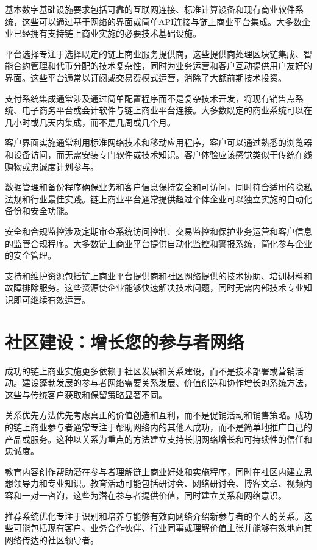 \documentclass[
  Letterpaper,
]{scrbook}
\begin{document}
基本数字基础设施要求包括可靠的互联网连接、标准计算设备和现有商业软件系统，这些可以通过基于网络的界面或简单API连接与链上商业平台集成。大多数企业已经拥有支持链上商业实施的必要技术基础设施。

平台选择专注于选择既定的链上商业服务提供商，这些提供商处理区块链集成、智能合约管理和代币分配的技术复杂性，同时为业务运营和客户互动提供用户友好的界面。这些平台通常以订阅或交易费模式运营，消除了大额前期技术投资。

支付系统集成通常涉及通过简单配置程序而不是复杂技术开发，将现有销售点系统、电子商务平台或会计软件与链上商业平台连接。大多数既定的商业系统可以在几小时或几天内集成，而不是几周或几个月。

客户界面实施通常利用标准网络技术和移动应用程序，客户可以通过熟悉的浏览器和设备访问，而无需安装专门软件或技术知识。客户体验应该感觉类似于传统在线购物或忠诚度计划参与。

数据管理和备份程序确保业务和客户信息保持安全和可访问，同时符合适用的隐私法规和行业最佳实践。链上商业平台通常提供超过个体企业可以独立实施的自动化备份和安全功能。

安全和合规监控涉及定期审查系统访问控制、交易监控和保护业务运营和客户信息的监管合规程序。大多数链上商业平台提供自动化监控和警报系统，简化参与企业的安全管理。

支持和维护资源包括链上商业平台提供商和社区网络提供的技术协助、培训材料和故障排除服务。这些资源使企业能够快速解决技术问题，同时无需内部技术专业知识即可继续有效运营。

\section{社区建设：增长您的参与者网络}\label{ux793eux533aux5efaux8bbeux589eux957fux60a8ux7684ux53c2ux4e0eux8005ux7f51ux7edc}

成功的链上商业实施更多依赖于社区发展和关系建设，而不是技术部署或营销活动。建设蓬勃发展的参与者网络需要关系发展、价值创造和协作增长的系统方法，这些与传统客户获取和保留策略显著不同。

关系优先方法优先考虑真正的价值创造和互利，而不是促销活动和销售策略。成功的链上商业参与者通常专注于帮助网络内的其他人成功，而不是简单地推广自己的产品或服务。这种以关系为重点的方法建立支持长期网络增长和可持续性的信任和忠诚度。

教育内容创作帮助潜在参与者理解链上商业好处和实施程序，同时在社区内建立思想领导力和专业知识。教育活动可能包括研讨会、网络研讨会、博客文章、视频内容和一对一咨询，这些为潜在参与者提供价值，同时建立关系和网络意识。

推荐系统优化专注于识别和培养与能够有效向网络介绍新参与者的个人的关系。这些可能包括现有客户、业务合作伙伴、行业同事或理解价值主张并能够有效地向其网络传达的社区领导者。
\end{document}
